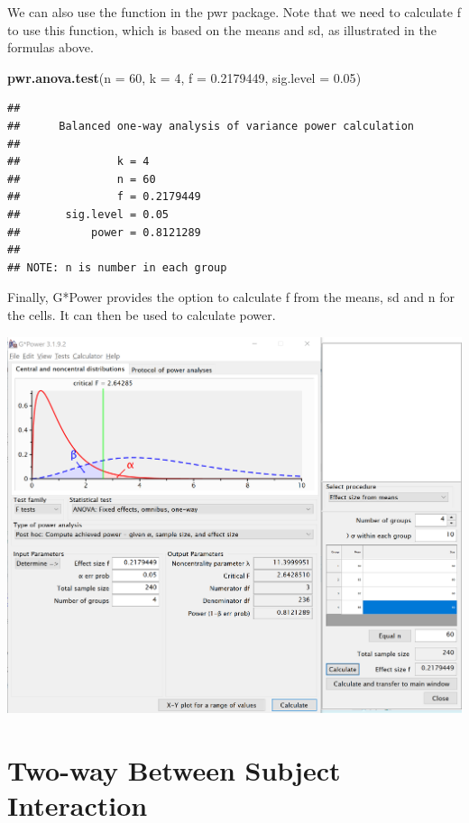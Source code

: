 \documentclass[]{book}
\newenvironment{Shaded}{\begin{snugshade}}{\end{snugshade}}
\newcommand{\DataTypeTok}[1]{\textcolor[rgb]{0.13,0.29,0.53}{#1}}
\newcommand{\DecValTok}[1]{\textcolor[rgb]{0.00,0.00,0.81}{#1}}
\newcommand{\FloatTok}[1]{\textcolor[rgb]{0.00,0.00,0.81}{#1}}
\newcommand{\KeywordTok}[1]{\textcolor[rgb]{0.13,0.29,0.53}{\textbf{#1}}}
\newcommand{\NormalTok}[1]{#1}
\begin{document}
We can also use the function in the pwr package. Note that we need to calculate f to use this function, which is based on the means and sd, as illustrated in the formulas above.

\begin{Shaded}
\begin{Highlighting}[]
\KeywordTok{pwr.anova.test}\NormalTok{(}\DataTypeTok{n =} \DecValTok{60}\NormalTok{,}
               \DataTypeTok{k =} \DecValTok{4}\NormalTok{,}
               \DataTypeTok{f =} \FloatTok{0.2179449}\NormalTok{,}
               \DataTypeTok{sig.level =} \FloatTok{0.05}\NormalTok{)}
\end{Highlighting}
\end{Shaded}

\begin{verbatim}
## 
##      Balanced one-way analysis of variance power calculation 
## 
##               k = 4
##               n = 60
##               f = 0.2179449
##       sig.level = 0.05
##           power = 0.8121289
## 
## NOTE: n is number in each group
\end{verbatim}

Finally, G*Power provides the option to calculate f from the means, sd and n for the cells. It can then be used to calculate power.

\includegraphics{screenshots/gpower_13.png}

\hypertarget{two-way-between-subject-interaction}{%
\section{Two-way Between Subject Interaction}\label{two-way-between-subject-interaction}}
\end{document}
